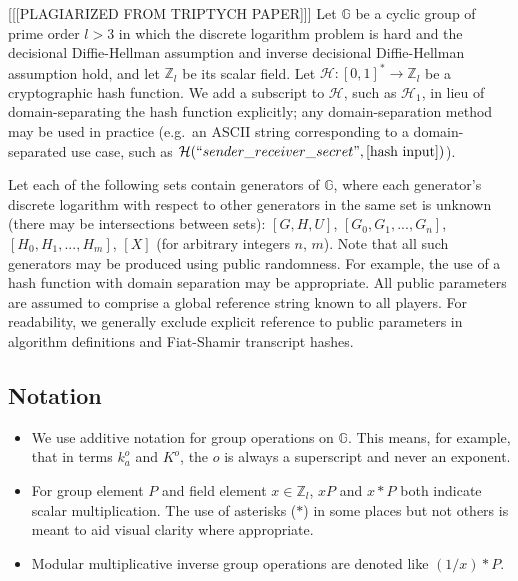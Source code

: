 [[[PLAGIARIZED FROM TRIPTYCH PAPER]]] Let $\mathbb{G}$ be a cyclic group of prime order $l > 3$ in which the discrete logarithm problem is hard and the decisional Diffie-Hellman assumption and inverse decisional Diffie-Hellman assumption hold, and let $\mathbb{Z}_l$ be its scalar field. Let $\mathcal{H}: [0,1]^* \to \mathbb{Z}_l$ be a cryptographic hash function. We add a subscript to $\mathcal{H}$, such as $\mathcal{H}_1$, in lieu of domain-separating the hash function explicitly; any domain-separation method may be used in practice (e.g.\ an ASCII string corresponding to a domain-separated use case, such as $\mathcal{H}(``sender\_receiver\_secret",[\textrm{hash input}])$).

Let each of the following sets contain generators of $\mathbb{G}$, where each generator's discrete logarithm with respect to other generators in the same set is unknown (there may be intersections between sets): $[G, H, U]$, $[G_0, G_1,...,G_n]$, $[H_0, H_1,...,H_m]$, $[X]$ (for arbitrary integers $n$, $m$). Note that all such generators may be produced using public randomness. For example, the use of a hash function with domain separation may be appropriate. All public parameters are assumed to comprise a global reference string known to all players. For readability, we generally exclude explicit reference to public parameters in algorithm definitions and Fiat-Shamir transcript hashes.


\subsection{Notation}
\label{subsec:preliminaries-notation}

\begin{itemize}
    \item We use additive notation for group operations on $\mathbb{G}$. This means, for example, that in terms $k^o_a$ and $K^o$, the $o$ is always a superscript and never an exponent.

    \item For group element $P$ and field element $x \in \mathbb{Z}_l$, $x P$ and $x*P$ both indicate scalar multiplication. The use of asterisks ($*$) in some places but not others is meant to aid visual clarity where appropriate.

    \item Modular multiplicative inverse group operations are denoted like $(1/x)*P$.
\end{itemize}



